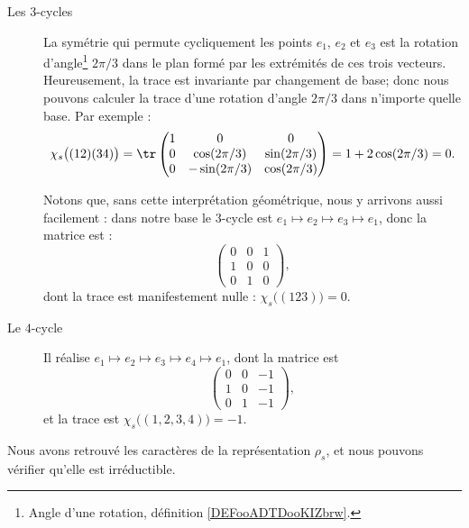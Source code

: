 \begin{description}
	\item[Les \( 3\)-cycles]
	      La symétrie qui permute cycliquement les points \( e_1\), \( e_2\) et \( e_3\) est la rotation d'angle\footnote{Angle d'une rotation, définition \ref{DEFooADTDooKIZbrw}.} \( 2\pi/3\) dans le plan formé par les extrémités de ces trois vecteurs. Heureusement, la trace est invariante par changement de base; donc nous pouvons calculer la trace d'une rotation d'angle \( 2\pi/3\) dans n'importe quelle base. Par exemple :
	      \begin{equation}
		      \chi_s\big( (12)(34) \big)=\tr\begin{pmatrix}
			      1 & 0             & 0            \\
			      0 & \cos(2\pi/3)  & \sin(2\pi/3) \\
			      0 & -\sin(2\pi/3) & \cos(2\pi/3)
		      \end{pmatrix}=1+2\cos(2\pi/3)=0.
	      \end{equation}

	      Notons que, sans cette interprétation géométrique, nous y arrivons aussi facilement : dans notre base le \( 3\)-cycle est \( e_1\mapsto e_2\mapsto e_3\mapsto e_1\), donc la matrice est :
	      \begin{equation}
		      \begin{pmatrix}
			      0 & 0 & 1 \\
			      1 & 0 & 0 \\
			      0 & 1 & 0
		      \end{pmatrix},
	      \end{equation}
	      dont la trace est manifestement nulle : \( \chi_s\big( (123) \big)=0\).

	\item[Le \( 4\)-cycle]

	      Il réalise \( e_1\mapsto e_2\mapsto e_3\mapsto e_4\mapsto e_1\), dont la matrice est
	      \begin{equation}        \label{EQooONDUooYlduup}
		      \begin{pmatrix}
			      0 & 0 & -1 \\
			      1 & 0 & -1 \\
			      0 & 1 & -1
		      \end{pmatrix},
	      \end{equation}
	      et la trace est \( \chi_s\big( (1,2,3,4) \big)=-1\).
\end{description}
Nous avons retrouvé les caractères de la représentation \( \rho_s\), et nous pouvons vérifier qu'elle est irréductible.

